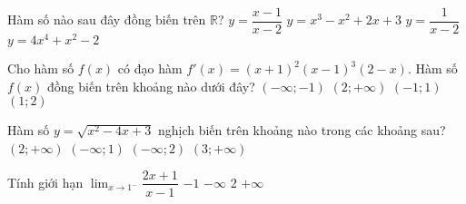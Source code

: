 \begin{ex}%
	Hàm số nào sau đây đồng biến trên $\mathbb{R}$?
	\choice
	{$y=\dfrac{x-1}{x-2}$}
	{\True $y=x^3-x^2+2x+3$}
	{$y=\dfrac{1}{x-2}$}
	{$y=4x^4+x^2-2$}
	\end{ex}
\begin{ex}%
	Cho hàm số $f(x)$ có đạo hàm $f'(x)=(x+1)^2(x-1)^3(2-x)$. Hàm số $f(x)$ đồng biến trên khoảng nào dưới đây?
	\choice
	{$(-\infty;-1)$}
	{$(2;+\infty)$}
	{$(-1;1)$}
	{\True $(1;2)$}
	\end{ex}
\begin{ex}%
	Hàm số $y=\sqrt{x^2-4x+3}$ nghịch biến trên khoảng nào trong các khoảng sau?
	\choice
	{$(2;+\infty)$}
	{\True$(-\infty;1)$}
	{$(-\infty;2)$}
	{$(3;+\infty)$}
	\end{ex}
\begin{ex}%
	Tính giới hạn  $\displaystyle \lim_{x\to1^-} \dfrac{2x+1}{x-1} $
	\choice
	{$-1$}
	{$-\infty$}
	{$2$}
	{\True$+\infty$}
	\end{ex}

